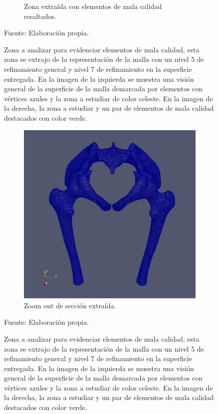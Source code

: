 \begin{figure}[!ht]
\begin{subfigure}[t]{0.45\textwidth}
        \caption{Zona extraída con elementos de mala calidad resaltados.}
    \end{subfigure}
    \caption{ Zona a analizar para evidenciar elementos de mala calidad, esta zona se extrajo de la representación de la malla con un nivel 5 de refinamiento general y nivel 7 de refinamiento en la superficie entregada. En la imagen de la izquierda se muestra una visión general de la superficie de la malla demarcada por elementos con vértices azules y la zona a estudiar de color celeste. En la imagen de la derecha, la zona a estudiar y un par de elementos de mala calidad destacados con color verde. }
    Fuente: Elaboración propia.
    \label{fig:zoom_cortex_surf}
\end{figure}



\begin{figure}[!ht]
    \centering
    \begin{subfigure}[t]{0.8\textwidth}
        \includegraphics[width=1.0\textwidth]{figures/meshes/coxis_8r9_01.png}
        \caption{Zoom out de sección extraída.}
    \end{subfigure}
    \caption{ Zona a analizar para evidenciar elementos de mala calidad, esta zona se extrajo de la representación de la malla con un nivel 5 de refinamiento general y nivel 7 de refinamiento en la superficie entregada. En la imagen de la izquierda se muestra una visión general de la superficie de la malla demarcada por elementos con vértices azules y la zona a estudiar de color celeste. En la imagen de la derecha, la zona a estudiar y un par de elementos de mala calidad destacados con color verde. }
    Fuente: Elaboración propia.
    \label{fig:zoom_cortex_surf}
\end{figure}


